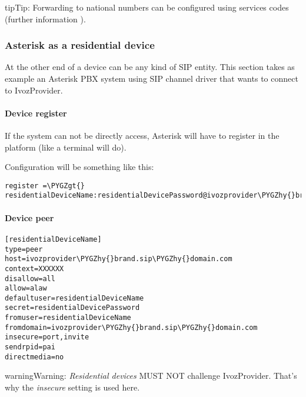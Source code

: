 \documentclass[letterpaper,10pt,english]{sphinxmanual}
\def\PYGZgt{\char`\>}
\def\PYGZhy{\char`\-}
\begin{document}
\begin{notice}{tip}{Tip:}
Forwarding to national numbers can be configured using services codes
(further information {\hyperref[administration_portal/brand/settings/generic_services:call\string-forward\string-services]{}}).
\end{notice}


\subsubsection{Asterisk as a residential device}
\label{administration_portal/client/residential/residential_devices:asterisk-as-a-residential-device}
At the other end of a device can be any kind of SIP entity. This section takes
as example an Asterisk PBX system using SIP channel driver that wants to connect
to IvozProvider.


\paragraph{Device register}
\label{administration_portal/client/residential/residential_devices:device-register}
If the system can not be directly access, Asterisk will have to register in the
platform (like a terminal will do).

Configuration will be something like this:

\begin{Verbatim}[commandchars=\\\{\}]
register =\PYGZgt{} residentialDeviceName:residentialDevicePassword@ivozprovider\PYGZhy{}brand.sip\PYGZhy{}domain.com
\end{Verbatim}


\paragraph{Device peer}
\label{administration_portal/client/residential/residential_devices:device-peer}
\begin{Verbatim}[commandchars=\\\{\}]
[residentialDeviceName]
type=peer
host=ivozprovider\PYGZhy{}brand.sip\PYGZhy{}domain.com
context=XXXXXX
disallow=all
allow=alaw
defaultuser=residentialDeviceName
secret=residentialDevicePassword
fromuser=residentialDeviceName
fromdomain=ivozprovider\PYGZhy{}brand.sip\PYGZhy{}domain.com
insecure=port,invite
sendrpid=pai
directmedia=no
\end{Verbatim}

\begin{notice}{warning}{Warning:}
\emph{Residential devices} MUST NOT challenge IvozProvider. That's
why the \emph{insecure} setting is used here.
\end{notice}
\end{document}
